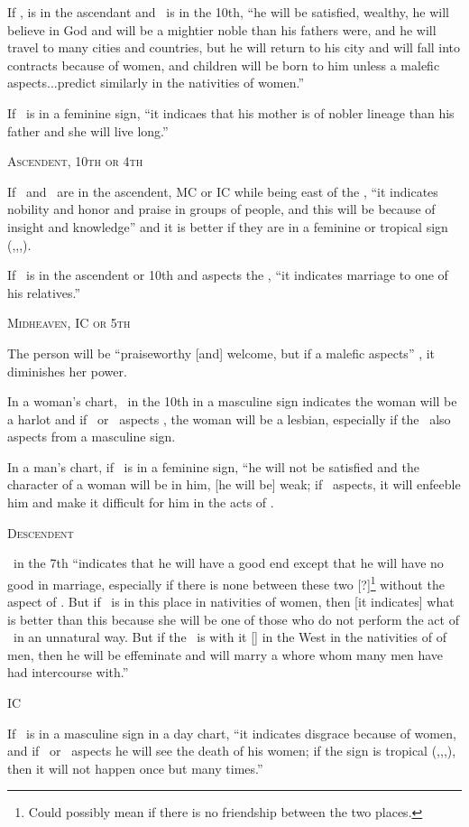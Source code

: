 If \Venus, is in the ascendant and \Saturn\, is in the 10th, ``he will be satisfied, wealthy, he will believe in God and will be a mightier noble than his fathers were, and he will travel to many cities and countries, but he will return to his city and will fall into contracts because of women, and children will be born to him unless a malefic aspects...predict similarly in the nativities of women.''

If \Venus\,  is in a feminine sign, ``it indicaes that his mother is of nobler lineage than his father and she will live long.''

\noindent\textsc{Ascendent, 10th or 4th}

If \Venus\, and \Mercury\, are in the ascendent, MC or IC while being east of the \Sun, ``it indicates nobility and honor and praise in groups of people, and this will be because of insight and knowledge'' and it is better if they are in a feminine or tropical sign (\Aries,\Cancer,\Libra,\Capricorn).

If \Venus\, is in the ascendent or 10th and aspects the \Moon, ``it indicates marriage to one of his relatives.''

\noindent\textsc{Midheaven, IC or 5th}

The person will be ``praiseworthy [and] welcome, but if a malefic aspects'' \Venus, it diminishes her power.

In a woman's chart, \Venus\, in the 10th in a masculine sign indicates the woman will be a harlot and if \Mars\, or \Mercury\, aspects \Venus, the woman will be a lesbian, especially if the \Moon\, also aspects from a masculine sign.

In a man's chart, if \Venus\, is in a feminine sign, ``he will not be satisfied and the character of a woman will be in him, [he will be] weak; if \Saturn\, aspects, it will enfeeble him and make it difficult for him in the acts of \Venus.

\noindent\textsc{Descendent}

\Venus\, in the 7th ``indicates that he will have a good end except that he will have no good in marriage, especially if there is none between these two [?]\footnote{Could possibly mean if there is no friendship between the two places.} without the aspect of \Jupiter. But if \Venus\, is in this place in nativities of women, then [it indicates] what is better than this because she will be one of those who do not perform the act of \Venus\, in an unnatural way. But if the \Moon\, is with it [\Venus] in the West in the nativities of of men, then he will be effeminate and will marry a whore whom many men have had intercourse with.''

\noindent\textsc{IC}

If \Venus\, is in a masculine sign in a day chart, ``it indicates disgrace because of women, and if \Saturn\, or \Mars\, aspects he will see the death of his women; if the sign is tropical (\Aries,\Cancer,\Libra,\Capricorn), then it will not happen once but many times.''


